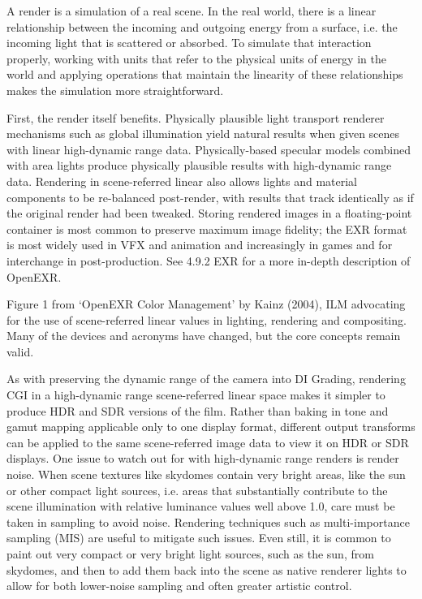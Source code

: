 A render is a simulation of a real scene. In the real world, there is a linear relationship between the incoming and outgoing energy from a surface, i.e. the incoming light that is scattered or absorbed. To simulate that interaction properly, working with units that refer to the physical units of energy in the world and applying operations that maintain the linearity of these relationships makes the simulation more straightforward.

First, the render itself benefits. Physically plausible light transport renderer mechanisms such as global illumination yield natural results when given scenes with linear high-dynamic range data. Physically-based specular models combined with area lights produce physically plausible results with high-dynamic range data. Rendering in scene-referred linear also allows lights and material components to be re-balanced post-render, with results that track identically as if the original render had been tweaked. Storing rendered images in a floating-point container is most common to preserve maximum image fidelity; the EXR format is most widely used in VFX and animation and increasingly in games and for interchange in post-production. See 4.9.2 EXR for a more in-depth description of OpenEXR.

Figure 1 from ‘OpenEXR Color Management’ by Kainz (2004), ILM advocating for the use of scene-referred linear values in lighting, rendering and compositing. Many of the devices and acronyms have changed, but the core concepts remain valid.

As with preserving the dynamic range of the camera into DI Grading, rendering CGI in a high-dynamic range scene-referred linear space makes it simpler to produce HDR and SDR versions of the film. Rather than baking in tone and gamut mapping applicable only to one display format, different output transforms can be applied to the same scene-referred image data to view it on HDR or SDR displays.
One issue to watch out for with high-dynamic range renders is render noise. When scene textures like skydomes contain very bright areas, like the sun or other compact light sources, i.e. areas that substantially contribute to the scene illumination with relative luminance values well above 1.0, care must be taken in sampling to avoid noise. Rendering techniques such as multi-importance sampling (MIS) are useful to mitigate such issues. Even still, it is common to paint out very compact or very bright light sources, such as the sun, from skydomes, and then to add them back into the scene as native renderer lights to allow for both lower-noise sampling and often greater artistic control.

